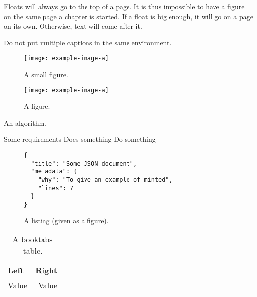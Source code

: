 \documentclass[
  a4paper,
  fontsize = 11pt,
  english,
  openany,
  twoside = false,
  roman equations,
]{thesis}
\begin{document}
  Floats will always go to the top of a page.
  It is thus impossible to have a figure on the same page a chapter is started.
  If a float is big enough, it will go on a page on its own.
  Otherwise, text will come after it.

  Do not put multiple captions in the same environment.

  \begin{figure}
    \texttt{[image: example-image-a]}
    \caption{A small figure.}
  \end{figure}

  \begin{figure}
    \texttt{[image: example-image-a]}
    \caption{A figure.}
  \end{figure}

  \begin{algorithm}
    \caption{An algorithm.}
    \begin{algorithmic}[1]
      \Require Some requirements
      \Ensure Does something
      \Statex
        \State Do something
      \EndWhile
      \State {}
    \end{algorithmic}
  \end{algorithm}

  \begin{figure}
    \begin{verbatim}
{
  "title": "Some JSON document",
  "metadata": {
    "why": "To give an example of minted",
    "lines": 7
  }
}
    \end{verbatim}
    \caption{A listing (given as a figure).}
  \end{figure}

  \begin{table}
    \begin{tabular}{l r}
      \toprule
      Left & Right
      \\
      \midrule
      Value & Value
      \\
      \bottomrule
    \end{tabular}
    \caption{A \textsf{booktabs} table.}
  \end{table}

  \blindtext[10]
  \blindtext[10]

  \begin{appendices}
    \Blinddocument
  \end{appendices}

  \backmatter

  \Blinddocument

  \printbibliography

  \printindex\label{index}

  \glsaddall[types={notations}]
  \printglossary[
    type=notations,
    style=long-symbol,
    nonumberlist,
  ]
\end{document}
